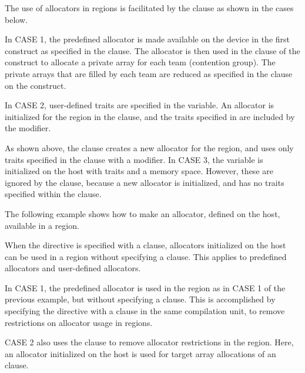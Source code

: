 \pagebreak
{}

The use of allocators in  regions is facilitated by the
 clause as shown in the cases below.

In CASE 1, the predefined  allocator is made available on the
device in the first  construct as specified in the  clause.
The allocator is then used in the 
clause of the  construct to allocate a private array for each
team (contention group). The private  arrays that are filled by each
team are reduced as specified in the  clause on the  construct.

In CASE 2, user-defined traits are specified in the  variable.
An allocator is initialized for the  region in the  clause,
and the traits specified in  are included by the  modifier.

As shown above, the  clause creates a new allocator for the
 region, and uses only traits specified in the clause with a modifier.
In CASE 3, the  variable is initialized on the host with traits
and a memory space. However, these are ignored by the  clause,
because a new allocator is initialized, and has no traits specified within the clause.


The following example shows how to make an allocator, defined on the host, available in a  region.

When the  directive is specified with a 
clause, allocators initialized on the host can be used in a  region
without specifying a  clause. This applies to predefined
allocators and user-defined allocators.

In CASE 1, the predefined  allocator is used in the 
region as in CASE 1 of the previous example, but without specifying a  clause.
This is accomplished by specifying the  directive with a
 clause in the same compilation unit, to remove
restrictions on allocator usage in  regions.

CASE 2 also uses the  clause to remove allocator
restrictions in the  region. Here, an allocator initialized
on the host is used for target array allocations of an  clause.


